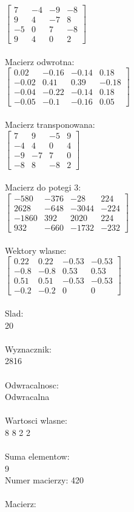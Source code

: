 \documentclass[a4paper,12pt]{article}
\begin{document}
$\begin{bmatrix} 7&-4&-9&-8\\9&4&-7&8\\-5&0&7&-8\\9&4&0&2 \end{bmatrix}$
\\
\\
Macierz odwrotna:\\

$\begin{bmatrix} 0.02&-0.16&-0.14&0.18\\-0.02&0.41&0.39&-0.18\\-0.04&-0.22&-0.14&0.18\\-0.05&-0.1&-0.16&0.05 \end{bmatrix}$
\\
\\
Macierz transponowana:\\

$\begin{bmatrix} 7&9&-5&9\\-4&4&0&4\\-9&-7&7&0\\-8&8&-8&2 \end{bmatrix}$
\\
\\
Macierz do potegi 3:\\

$\begin{bmatrix} -580&-376&-28&224\\2628&-648&-3044&-224\\-1860&392&2020&224\\932&-660&-1732&-232 \end{bmatrix}$
\\
\\
Wektory wlasne:\\

$\begin{bmatrix} 0.22&0.22&-0.53&-0.53\\-0.8&-0.8&0.53&0.53\\0.51&0.51&-0.53&-0.53\\-0.2&-0.2&0&0 \end{bmatrix}$
\\
\\
Slad:\\
20
\\
\\
Wyznacznik:\\
2816
\\
\\
Odwracalnosc:\\
Odwracalna
\\
\\
Wartosci wlasne:\\
8 8 2 2
\\
\\
Suma elementow:\\
9
\\
\newpage
Numer macierzy:
420
\\
\\
Macierz:\\
\end{document}
